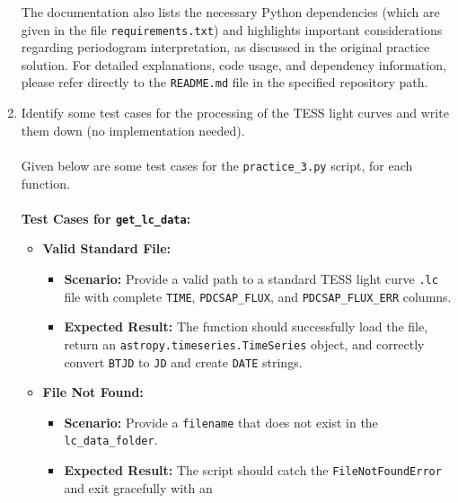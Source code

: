 \documentclass[a4paper,12pt]{article}
\DeclareRobustCommand{\regular}{\fontseries{m}\selectfont}
\DeclareRobustCommand{\bold}{\fontseries{b}\selectfont}
\newcommand{\bcode}[1]{\texttt{\fontsize{11}{13}\selectfont\bold#1}}
\newenvironment{solution}{}{}
\begin{document}
\begin{enumerate}
\begin{solution}
            The documentation also lists the necessary Python dependencies
            (which are given in the file \bcode{requirements.txt}) and highlights
            important considerations regarding periodogram interpretation, as
            discussed in the original practice solution. For detailed explanations,
            code usage, and dependency information, please refer directly to the
            \bcode{README.md} file in the specified repository path.
        \end{solution}\vspace{-0.5em}
        \item Identify some test cases for the processing of the TESS light curves
        and write them down (no implementation needed).
        \begin{solution}
            \\\\\regular Given below are some test cases for the
            \bcode{practice\_3.py} script, for each function. \\\\
            \textbf{Test Cases for \bcode{get\_lc\_data}:}
            \begin{itemize}
                \item \textbf{Valid Standard File:}
                \begin{itemize}
                    \item \textbf{Scenario:} Provide a valid path to a standard
                    TESS light curve \bcode{.lc} file with complete \bcode{TIME},
                    \bcode{PDCSAP\_FLUX}, and \bcode{PDCSAP\_FLUX\_ERR} columns.
                    \item \textbf{Expected Result:} The function should successfully
                    load the file, return an \bcode{astropy.timeseries.TimeSeries}
                    object, and correctly convert \bcode{BTJD} to \bcode{JD} and
                    create \bcode{DATE} strings.
                \end{itemize}
                \item \textbf{File Not Found:}
                \begin{itemize}
                    \item \textbf{Scenario:} Provide a \bcode{filename} that does
                    not exist in the \bcode{lc\_data\_folder}.
                    \item \textbf{Expected Result:} The script should catch the
                    \bcode{FileNotFoundError} and exit gracefully with an

\end{itemize}
\end{itemize}
\end{solution}
\end{enumerate}
\end{document}
